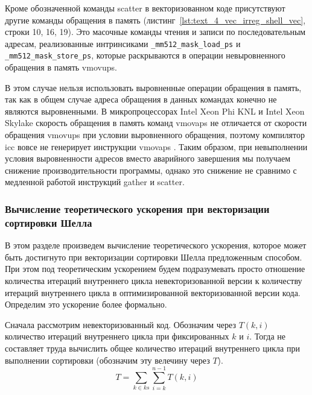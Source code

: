 Кроме обозначенной команды scatter в векторизованном коде присутствуют другие команды обращения в память (листинг~\ref{lst:text_4_vec_irreg_shell_vec}, строки 10, 16, 19).
Это масочные команды чтения и записи по последовательным адресам, реализованные интринсиками \texttt{\_mm512\_mask\_load\_ps} и \texttt{\_mm512\_mask\_store\_ps}, которые раскрываются в операции невыровненного обращения в память vmovups.

В этом случае нельзя использовать выровненные операции обращения в память, так как в общем случае адреса обращения в данных командах конечно не являются выровненными.
В микропроцессорах Intel Xeon Phi KNL\label{abbr:knl13} и Intel Xeon Skylake скорость обращения в память команд vmovaps не отличается от скорости обращения vmovups при условии выровненного обращения, поэтому компилятор icc вовсе не генерирует инструкции vmovaps \cite{MOVUPSintel}.
Таким образом, при невыполнении условия выровненности адресов вместо аварийного завершения мы получаем снижение производительности программы, однако это снижение не сравнимо с медленной работой инструкций gather и scatter.

\subsubsection{Вычисление теоретического ускорения при векторизации сортировки Шелла}

В этом разделе произведем вычисление теоретического ускорения, которое может быть достигнуто при векторизации сортировки Шелла предложенным способом. 
При этом под теоретическим ускорением будем подразумевать просто отношение количества итераций внутреннего цикла невекторизованной версии к количеству итераций внутреннего цикла в оптимизированной векторизованной версии кода.
Определим это ускорение более формально.

Сначала рассмотрим невекторизованный код.
Обозначим через $T(k, i)$ количество итераций внутреннего цикла при фиксированных $k$ и $i$. 
Тогда не составляет труда вычислить общее количество итераций внутреннего цикла при выполнении сортировки (обозначим эту велечину через $T$).
\begin{equation}
	T = \sum_{k \in ks}{\sum_{i = k}^{n - 1}{T(k, i)}}
\end{equation}

